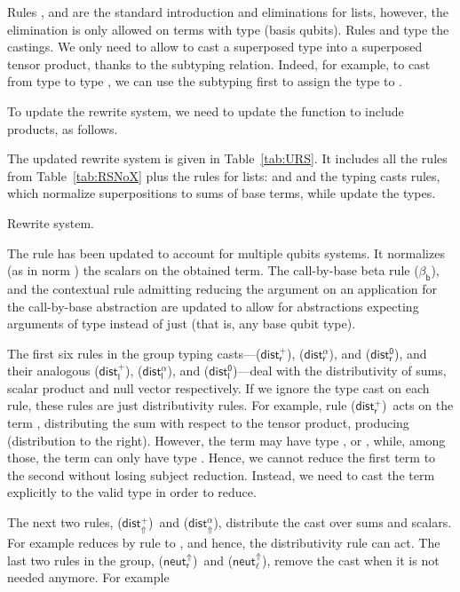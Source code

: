 \documentclass[preprint]{elsarticle}
\newcommand\s[1]{\ensuremath{\mathsf{#1}}}
\newcommand\rbetab{(\s{\beta_b})}
\newcommand\rdistcasum{(\s{dist^+_\Uparrow})}
\newcommand\rdistcascal{(\s{dist^\alpha_\Uparrow})}
\newcommand\rcaneutl{(\s{neut^\Uparrow_\ell})}
\newcommand\rcaneutr{(\s{neut^\Uparrow_r})}
\newcommand\rdistzr{(\s{dist^0_r})}
\newcommand\rdistzl{(\s{dist^0_l})}
\newcommand\rdistscalr{(\s{dist^\alpha_r})}
\newcommand\rdistscall{(\s{dist^\alpha_l})}
\newcommand\rdistsumr{(\s{dist^+_r})}
\newcommand\rdistsuml{(\s{dist^+_l})}
\begin{document}
Rules ,  and  are the standard
introduction and eliminations for lists, however, the elimination is only
allowed on terms with type  (basis qubits). Rules  and
 type the castings. We only need to allow to cast a superposed type
into a superposed tensor product, thanks to the subtyping relation. Indeed, for
example, to cast  from type  to type , we can use the subtyping first to assign the type  to
.

To update the rewrite system, we need to update the function  to
include products, as follows.


The updated rewrite system is given in Table~\ref{tab:URS}. It includes all the
rules from Table~\ref{tab:RSNoX} plus the rules for lists:  and 
and the typing casts rules, which normalize superpositions to sums of base
terms, while update the types.

\begin{table}\centering
  \caption{Rewrite system.}
  \label{tab:URS}
\end{table}

The rule  has been updated to account for multiple qubits systems. It
normalizes (as in norm ) the scalars on the obtained term. The call-by-base
beta rule \rbetab, and the contextual rule admitting reducing the argument on an
application for the call-by-base abstraction are updated to allow for
abstractions expecting arguments of type  instead of just  (that is, any
base qubit type).


The first six rules in the group typing casts---\rdistsumr, \rdistscalr, and
\rdistzr, and their analogous \rdistsuml, \rdistscall, and \rdistzl---deal with
the distributivity of sums, scalar product and null vector respectively. If we
ignore the type cast  on each rule, these rules are just
distributivity rules. For example, rule \rdistsumr\ acts on the term , distributing the sum with respect to the tensor product, producing
 (distribution to the right). However, the term
 may have type ,  or
, while, among those, the term 
can only have type . Hence, we cannot reduce the first term to
the second without losing subject reduction. Instead, we need to cast the term
explicitly to the valid type in order to reduce.

The next two rules, \rdistcasum\ and \rdistcascal, distribute the cast over sums
and scalars. For example  reduces by rule 
to , and hence,
the distributivity rule can act.
The last two rules in the group, \rcaneutr\ and \rcaneutl, remove the cast when
it is not needed anymore. For example
\end{document}
